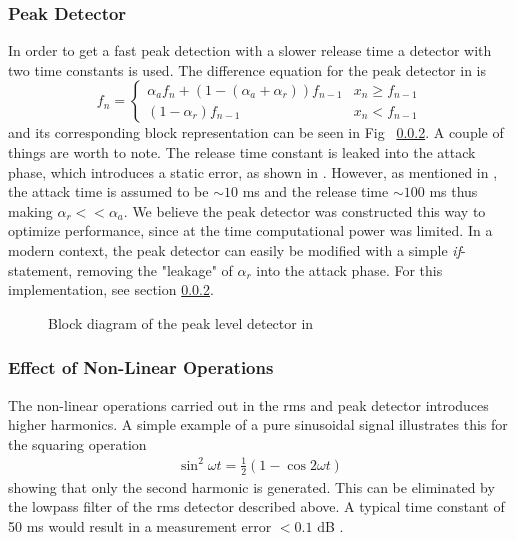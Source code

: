 \documentclass[../main2.tex]{subfiles}
\providecommand{\rootdir}{..}
\begin{document}
\subsubsection{Peak Detector}
In order to get a fast peak detection with a slower release time a detector with two time constants is used. The difference equation for the peak detector in \cite{mcnally1984dynamic} is
\begin{equation}
f_n = \begin{cases}
    \alpha_{a} f_n + (1- (\alpha_{a} + \alpha_{r})) f_{n-1}  	& x_n \geq f_{n-1} \\
    (1-\alpha_{r}) f_{n-1} 								& x_n < f_{n-1}
\end{cases}
\end{equation}
and its corresponding block representation can be seen in Fig ~\ref{}. A couple of things are worth to note. The release time constant is leaked into the attack phase, which introduces a static error, as shown in \cite{giannoulis2012}. However, as mentioned in \cite{mcnally1984dynamic}, the attack time is assumed to be $\sim 10$ ms and the release time   $\sim 100$ ms thus making $\alpha_r << \alpha_a$. We believe the peak detector was constructed this way to optimize performance, since at the time computational power was limited. In a modern context, the peak detector can easily be modified with a simple \emph{if}-statement, removing the "leakage" of $\alpha_r$ into the attack phase. For this implementation, see section \ref{}.
\begin{figure}
\centerline{}
\caption{Block diagram of the peak level detector in \cite{mcnally1984dynamic}}
\label{fig:block_mcnally_theory_rms}
\end{figure}
\subsubsection{Effect of Non-Linear Operations}
The non-linear operations carried out in the rms and peak detector introduces higher harmonics. A simple example of a pure sinusoidal signal illustrates this for the squaring operation
\begin{align}
\sin^2{\omega t} = \frac{1}{2}(1-\cos{2\omega t}) 
\end{align}
showing that only the second harmonic is generated. This can be eliminated by the lowpass filter of the rms detector described above. A typical time constant of 50 ms would result in a measurement error $< 0.1$ dB \cite{mcnally1984dynamic}.
\end{document}
